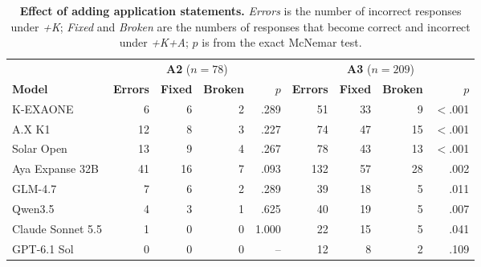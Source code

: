 \begin{table}[t]
\centering
\small
\caption{\textbf{Effect of adding application statements.}
\textit{Errors} is the number of incorrect responses under \textit{+K}; \textit{Fixed} and \textit{Broken} are the numbers of responses that become correct and incorrect under \textit{+K+A}; $p$ is from the exact McNemar test.}
\label{tab:knowledge_gain}
\begin{tabular*}{\textwidth}{@{\extracolsep{\fill}}lrrrrrrrr@{}}
\toprule
 & \multicolumn{4}{c}{\textbf{A2} ($n=78$)} & \multicolumn{4}{c}{\textbf{A3} ($n=209$)} \\
\cmidrule{2-5} \cmidrule{6-9}
\textbf{Model} & \textbf{Errors} & \textbf{Fixed} & \textbf{Broken} & $p$ & \textbf{Errors} & \textbf{Fixed} & \textbf{Broken} & $p$ \\
\midrule
K-EXAONE          & 6  & 6  & 2 & .289  & 51  & 33 & 9  & $<$.001 \\
A.X K1            & 12 & 8  & 3 & .227  & 74  & 47 & 15 & $<$.001 \\
Solar Open        & 13 & 9  & 4 & .267  & 78  & 43 & 13 & $<$.001 \\
\midrule
Aya Expanse 32B   & 41 & 16 & 7 & .093  & 132 & 57 & 28 & .002 \\
\midrule
GLM-4.7           & 7  & 6  & 2 & .289  & 39  & 18 & 5  & .011 \\
Qwen3.5           & 4  & 3  & 1 & .625  & 40  & 19 & 5  & .007 \\
\midrule
Claude Sonnet 5.5 & 1  & 0  & 0 & 1.000 & 22  & 15 & 5  & .041 \\
GPT-6.1 Sol       & 0  & 0  & 0 & --    & 12  & 8  & 2  & .109 \\
\bottomrule
\end{tabular*}
\end{table}